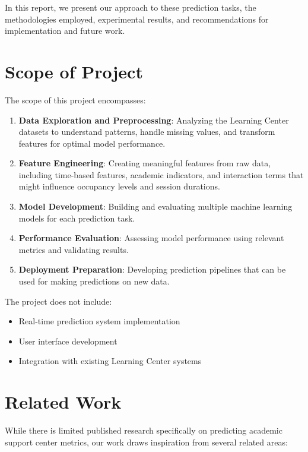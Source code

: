 \documentclass[12pt,letterpaper]{article}
\begin{document}
In this report, we present our approach to these prediction tasks, the methodologies employed, experimental results, and recommendations for implementation and future work.

\section{Scope of Project}

The scope of this project encompasses:

\begin{enumerate}
    \item \textbf{Data Exploration and Preprocessing}: Analyzing the Learning Center datasets to understand patterns, handle missing values, and transform features for optimal model performance.

    \item \textbf{Feature Engineering}: Creating meaningful features from raw data, including time-based features, academic indicators, and interaction terms that might influence occupancy levels and session durations.

    \item \textbf{Model Development}: Building and evaluating multiple machine learning models for each prediction task.

    \item \textbf{Performance Evaluation}: Assessing model performance using relevant metrics and validating results.

    \item \textbf{Deployment Preparation}: Developing prediction pipelines that can be used for making predictions on new data.
\end{enumerate}

The project does not include:
\begin{itemize}
    \item Real-time prediction system implementation
    \item User interface development
    \item Integration with existing Learning Center systems
\end{itemize}

\section{Related Work}

While there is limited published research specifically on predicting academic support center metrics, our work draws inspiration from several related areas:
\end{document}
